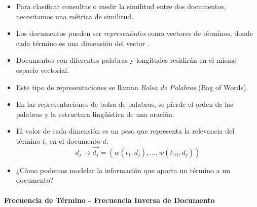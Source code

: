 \documentclass{book}
\begin{document}
\begin{itemize}
\item Para clasificar consultas o medir la similitud entre dos documentos, necesitamos una métrica de similitud.
\item Los documentos pueden ser \textit{representados} como vectores de términos, donde cada término es una dimensión del vector \cite{salton1975vector}.
\item Documentos con diferentes palabras y longitudes residirán en el mismo espacio vectorial.
\item Este tipo de representaciones se llaman \emph{Bolsa de Palabras} (Bag of Words).
\item En las representaciones de bolsa de palabras, se pierde el orden de las palabras y la estructura lingüística de una oración.
\item El valor de cada dimensión es un peso que representa la relevancia del término $t_{i}$ en el documento $d$.
\begin{equation}
d_{j} \rightarrow \overrightarrow{d_{j}}=(w(t_{1},d_{j}),...,w(t_{|V|},d_{j}))
\end{equation}
\item ¿Cómo podemos modelar la información que aporta un término a un documento?
\end{itemize}

\paragraph{Frecuencia de Término - Frecuencia Inversa de Documento}
\end{document}
